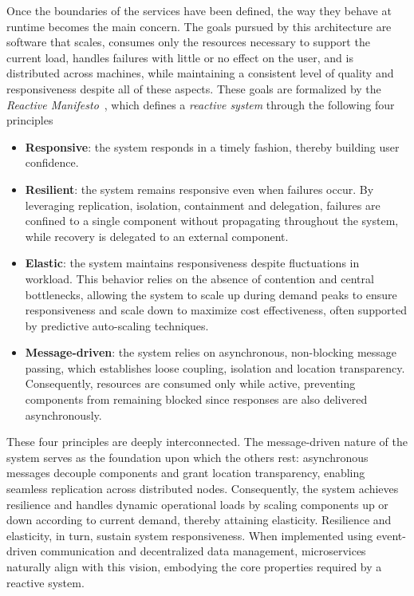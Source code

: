 Once the boundaries of the services have been defined, the way they behave at
runtime becomes the main concern. The goals pursued by this architecture are
software that scales, consumes only the resources necessary to support the
current load, handles failures with little or no effect on the user, and is
distributed across machines, while maintaining a consistent level of quality and
responsiveness despite all of these aspects. These goals are formalized by the
\textit{Reactive Manifesto}~\cite{reactive-manifesto}, which defines a
\textit{reactive system} through the following four principles
\begin{itemize}
    \item \textbf{Responsive}: the system responds in a timely fashion, thereby
    building user confidence. 
    \item \textbf{Resilient}: the system remains responsive even when failures
    occur. By leveraging replication, isolation, containment and delegation,
    failures are confined to a single component without propagating throughout
    the system, while recovery is delegated to an external component. 
    \item \textbf{Elastic}: the system maintains responsiveness despite
    fluctuations in workload. This behavior relies on the absence of contention
    and central bottlenecks, allowing the system to scale up during demand peaks
    to ensure responsiveness and scale down to maximize cost effectiveness,
    often supported by predictive auto-scaling techniques. 
    \item \textbf{Message-driven}: the system relies on asynchronous,
    non-blocking message passing, which establishes loose coupling, isolation
    and location transparency. Consequently, resources are consumed only while
    active, preventing components from remaining blocked since responses are
    also delivered asynchronously. 
\end{itemize}
These four principles are deeply interconnected. The message-driven nature of
the system serves as the foundation upon which the others rest: asynchronous
messages decouple components and grant location transparency, enabling seamless
replication across distributed nodes. Consequently, the system achieves
resilience and handles dynamic operational loads by scaling components up or
down according to current demand, thereby attaining elasticity. Resilience and
elasticity, in turn, sustain system responsiveness. When implemented using
event-driven communication and decentralized data management, microservices
naturally align with this vision, embodying the core properties required by a
reactive system. \\

